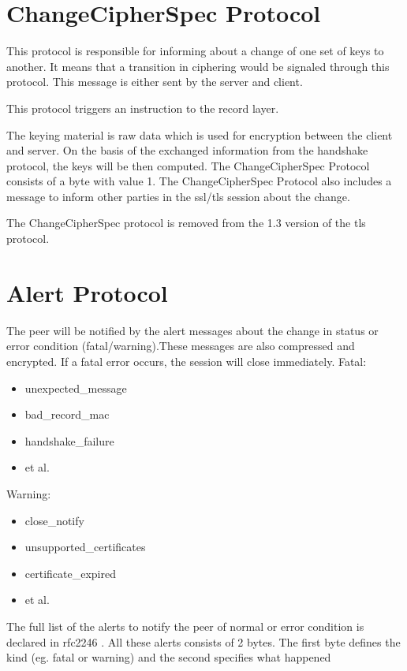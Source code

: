 \section{ChangeCipherSpec Protocol}
\label{sec:changeciphfer_protocol}
This protocol is responsible for informing about a change of one set of keys to another. It means that a transition in ciphering would be signaled through this protocol. This message is either sent by the server and client. 

This protocol triggers an instruction to the record layer.

The keying material is raw data which is used for encryption between the client and server. On the basis of the exchanged information from the handshake protocol, the keys will be then computed.
The ChangeCipherSpec Protocol consists of a byte with value 1.
The ChangeCipherSpec Protocol also includes a message to inform other parties in the \gls{ssl}/\gls{tls} session about the change.   \cite{ms:overview}

The ChangeCipherSpec protocol is removed from the 1.3 version of the \gls{tls} protocol.
\cite{WikipediaCipher}
\section{Alert Protocol}
\label{sec:alert_protocol}
The peer will be notified by the alert messages about the change in status or error condition (fatal/warning).These messages are also compressed and encrypted. If a fatal error occurs, the session will close immediately.
Fatal:
\begin{itemize}
	\item unexpected\_message
	 \item bad\_record\_\gls{mac}
	 \item handshake\_failure 
	 \item et al.
\end{itemize}
	
Warning:
\begin{itemize}
\item close\_notify
\item unsupported\_certificates
\item certificate\_expired
\item et al.

\end{itemize}

The full list of the alerts to notify the peer of normal or error condition is declared in \gls{rfc}2246 \cite{rfc2246}. All these alerts consists of 2 bytes. The first byte defines the kind (eg. fatal or warning) and the second specifies what happened \cite{W.Stalling} \cite{ms:overview}

